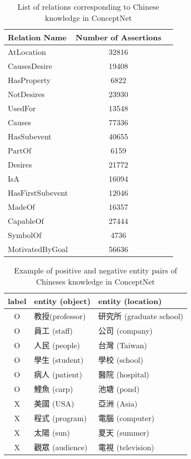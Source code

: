 \begin{table}[t]
\begin{center}
\begin{tabular}{lcc}
\hline
Relation Name   & Number of Assertions\\  
\hline
AtLocation  & 32816\\
CausesDesire & 19408\\
HasProperty & 6822\\
NotDesires & 23930\\
UsedFor & 13548\\
Causes & 77336\\
HasSubevent & 40655\\
PartOf & 6159\\
Desires & 21772\\
IsA & 16094\\
HasFirstSubevent & 12046\\
MadeOf & 16357\\
CapableOf & 27444\\
SymbolOf & 4736\\
MotivatedByGoal &56636\\
\hline
\end{tabular}
\caption[List of relations corresponding to Chinese knowledge in ConceptNet]{\small List of relations corresponding to Chinese knowledge in ConceptNet}
\label{tab:relation_list}
\end{center}
\end{table}

\begin{table}[t]
\begin{center}
\begin{tabular}{| c | l | l |}
\hline
label  &   entity (object)   &    entity (location)\\
\hline
O   &   教授(professor)   &   研究所 (graduate school)\\
O   &   員工 (staff)   &   公司 (company)\\
O   &   人民 (people)   &   台灣 (Taiwan)\\
O   &   學生 (student)   &   學校 (school)\\
O   &   病人 (patient)   &   醫院 (hospital)\\
O   &   鯉魚 (carp)   &   池塘 (pond)\\
X   &   美國 (USA)   &   亞洲 (Asia)\\
X   &   程式 (program)   &   電腦 (computer)\\
X   &   太陽 (sun)   &   夏天 (summer)\\
X   &   觀眾 (audience)   &   電視 (television)\\
\hline
\end{tabular}
\caption[Example of positive and negative entity pairs of Chineses knowledge in ConceptNet]{\small Example of positive and negative entity pairs of Chineses knowledge in ConceptNet}
\label{tab:AtLocation_seed}
\end{center}
\end{table}

